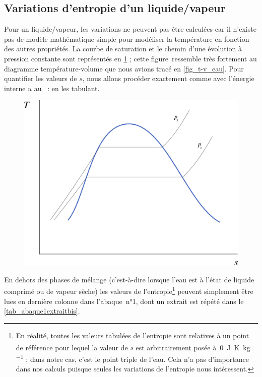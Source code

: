 	\subsection{Variations d’entropie d’un liquide/vapeur}
	
		Pour un liquide/vapeur, les variations ne peuvent pas être calculées car il n’existe pas de modèle mathématique simple pour modéliser la température en fonction des autres propriétés. La courbe de saturation et le chemin d’une évolution à pression constante sont représentés en \cref{fig_ts_lv} ; cette figure~ressemble très fortement au diagramme température-volume que nous avions tracé en \cref{fig_t-v_eau}.
		Pour quantifier les valeurs de $s$, nous allons procéder exactement comme avec l’énergie interne $u$ au \courscinqshort~: en les tabulant.

		\begin{figure}
			\begin{center}
				\includegraphics[width=\didacticpvdiagramwidth]{images/ts_lv.png}
			\end{center}
			\label{fig_ts_lv}
		\end{figure}
		
		En dehors des phases de mélange (c’est-à-dire lorsque l’eau est à l’état de liquide comprimé ou de vapeur sèche) les valeurs de l’entropie\footnote{En réalité, toutes les valeurs tabulées de l’entropie sont relatives à un point de référence pour lequel la valeur de $s$ est arbitrairement posée à~\SI{0}{\joule\per\kelvin\per\kilogram} ; dans notre cas, c’est le point triple de l’eau. Cela n’a pas d’importance dans nos calculs puisque seules les variations de l’entropie nous intéressent.} peuvent simplement être lues en dernière colonne dans l’abaque~n°1, dont un extrait est répété dans le \cref{tab_abaque1extraitbis}.
		
